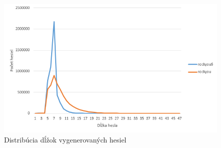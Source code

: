 \begin{figure}[ht]
    \centering
    \includegraphics[width=1\textwidth]{sizeDist}
    \caption{Distribúcia dĺžok vygenerovaných hesiel}
    \label{fig:sizeDist}
\end{figure}

